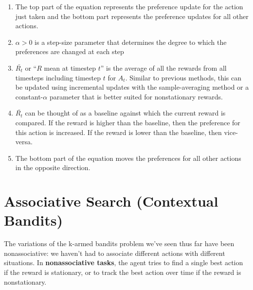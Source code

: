 \begin{enumerate}
    \item The top part of the equation represents the preference update for the action just taken and the bottom part represents the preference updates for all other actions.
    \item $\alpha > 0$ is a step-size parameter that determines the degree to which the preferences are changed at each step
    \item $\bar{R_t}$ or “$R$ mean at timestep $t$” is the average of all the rewards from all timesteps including timestep $t$ for $A_t$. Similar to previous methods, this can be updated using incremental updates with the sample-averaging method or a constant-$\alpha$ parameter that is better suited for nonstationary rewards.
    \item $\bar{R_t}$ can be thought of as a baseline against which the current reward is compared. If the reward is higher than the baseline, then the preference for this action is increased. If the reward is lower than the baseline, then vice-versa.
    \item The bottom part of the equation moves the preferences for all other actions in the opposite direction.
\end{enumerate}


\section{Associative Search (Contextual Bandits) \cite{medium-numsmt2-rl-ch2-part-6, kaggle-parsasam-reinforcement-learning-notes-multi-armed-bandits}}\label{Associative Search (Contextual Bandits)}

The variations of the k-armed bandits problem we’ve seen thus far have been nonassociative: we haven’t had to associate different actions with different situations. In \textbf{nonassociative tasks}, the agent tries to find a single best action if the reward is stationary, or to track the best action over time if the reward is nonstationary.

